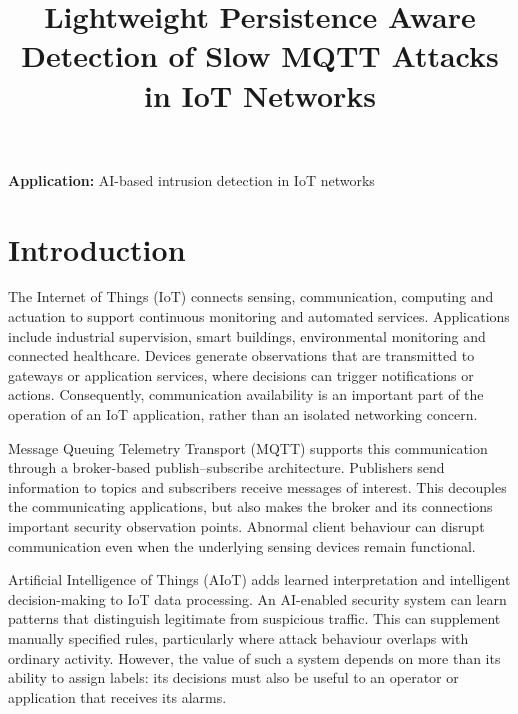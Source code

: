 \documentclass[conference]{IEEEtran}
\begin{document}
\title{Lightweight Persistence Aware Detection of Slow MQTT Attacks in IoT Networks}

\author{}

\maketitle
\raggedbottom
\noindent\textbf{Application:} AI-based intrusion detection in IoT networks



\section{Introduction}

The Internet of Things (IoT) connects sensing, communication, computing
and actuation to support continuous monitoring and automated services.
Applications include industrial supervision, smart buildings,
environmental monitoring and connected healthcare. Devices generate
observations that are transmitted to gateways or application services,
where decisions can trigger notifications or actions. Consequently,
communication availability is an important part of the operation of
an IoT application, rather than an isolated networking concern.

Message Queuing Telemetry Transport (MQTT) supports this communication
through a broker-based publish--subscribe architecture. Publishers
send information to topics and subscribers receive messages of
interest. This decouples the communicating applications, but also
makes the broker and its connections important security observation
points. Abnormal client behaviour can disrupt communication even
when the underlying sensing devices remain functional.

Artificial Intelligence of Things (AIoT) adds learned interpretation
and intelligent decision-making to IoT data processing. An AI-enabled
security system can learn patterns that distinguish legitimate from
suspicious traffic. This can supplement manually specified rules,
particularly where attack behaviour overlaps with ordinary activity.
However, the value of such a system depends on more than its ability
to assign labels: its decisions must also be useful to an operator
or application that receives its alarms.
\end{document}
